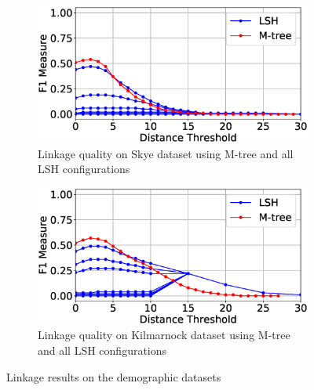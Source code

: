 \documentclass{llncs}
\begin{document}
\begin{figure}
\begin{subfigure}{.5\textwidth}
  \centering
\includegraphics[width=\textwidth]{figures/plotFs-skye-f}
\caption{Linkage quality on Skye dataset using M-tree and all LSH configurations}
\end{subfigure}%
\begin{subfigure}{.5\textwidth}
  \centering
\includegraphics[width=\textwidth]{figures/plotFs-kilmarnock-f}
\caption{Linkage quality on Kilmarnock dataset using M-tree and all LSH configurations}
\end{subfigure}

\caption{Linkage results on the demographic datasets}
\label{demography-quality}
\end{figure}

\end{document}
